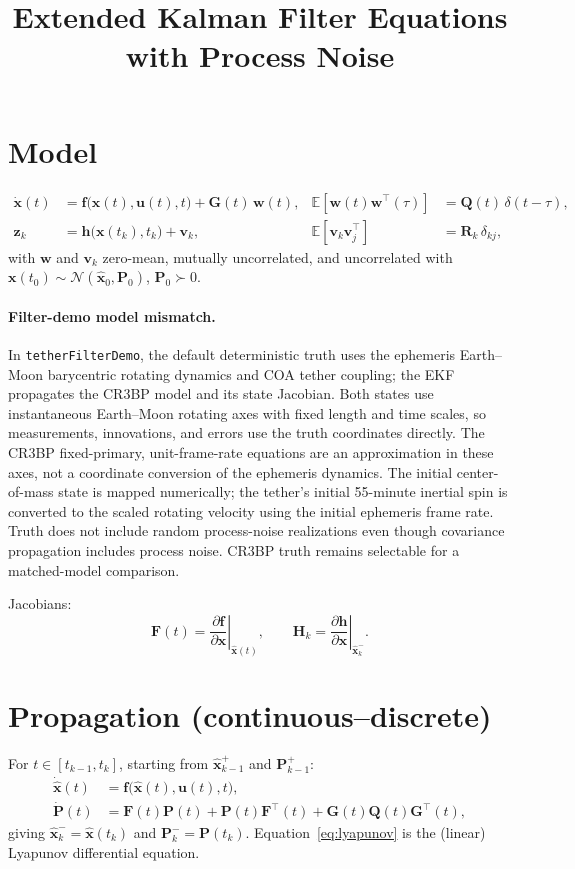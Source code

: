 \documentclass[]{article}
\title{Extended Kalman Filter Equations with Process Noise}
\author{}
\date{}
\newcommand{\x}{\bm{x}}
\newcommand{\xh}{\hat{\bm{x}}}
\newcommand{\z}{\bm{z}}
\newcommand{\Pm}{\mathbf{P}}
\newcommand{\Fm}{\mathbf{F}}
\newcommand{\Gm}{\mathbf{G}}
\newcommand{\Hm}{\mathbf{H}}
\newcommand{\Qm}{\mathbf{Q}}
\newcommand{\Rm}{\mathbf{R}}
\begin{document}
\maketitle

\section*{Model}
\begin{align}
  \dot{\x}(t) &= \bm{f}\big(\x(t),\bm{u}(t),t\big) + \Gm(t)\,\bm{w}(t),
  & \mathbb{E}\!\left[\bm{w}(t)\bm{w}^\top(\tau)\right] &= \Qm(t)\,\delta(t-\tau), \\
  \z_k &= \bm{h}\big(\x(t_k),t_k\big) + \bm{v}_k,
  & \mathbb{E}\!\left[\bm{v}_k\bm{v}_j^\top\right] &= \Rm_k\,\delta_{kj},
\end{align}
with $\bm{w}$ and $\bm{v}_k$ zero-mean, mutually uncorrelated, and
uncorrelated with $\x(t_0)\sim\mathcal{N}(\xh_0,\Pm_0)$, $\Pm_0\succ 0$.

\paragraph{Filter-demo model mismatch.}
In \texttt{tetherFilterDemo}, the default deterministic truth uses the
ephemeris Earth--Moon barycentric rotating dynamics and COA tether coupling;
the EKF propagates the CR3BP model and its state Jacobian. Both states use
instantaneous Earth--Moon rotating axes with fixed length and time scales, so
measurements, innovations, and errors use the truth coordinates directly.
The CR3BP fixed-primary, unit-frame-rate equations are an approximation in
these axes, not a coordinate conversion of the ephemeris dynamics. The
initial center-of-mass state is mapped numerically; the tether's initial
55-minute inertial spin is converted to the scaled rotating velocity using
the initial ephemeris frame rate. Truth does not include random process-noise
realizations even though covariance propagation includes process noise.
CR3BP truth remains selectable for a matched-model comparison.

Jacobians:
\begin{equation}
  \Fm(t) = \left.\frac{\partial \bm{f}}{\partial \x}\right|_{\xh(t)}, \qquad
  \Hm_k  = \left.\frac{\partial \bm{h}}{\partial \x}\right|_{\xh_k^-}.
\end{equation}

\section*{Propagation (continuous--discrete)}
For $t\in[t_{k-1},t_k]$, starting from $\xh_{k-1}^+$ and $\Pm_{k-1}^+$:
\begin{align}
  \dot{\xh}(t) &= \bm{f}\big(\xh(t),\bm{u}(t),t\big), \\
  \dot{\Pm}(t) &= \Fm(t)\Pm(t) + \Pm(t)\Fm^\top(t) + \Gm(t)\Qm(t)\Gm^\top(t),
  \label{eq:lyapunov}
\end{align}
giving $\xh_k^- = \xh(t_k)$ and $\Pm_k^- = \Pm(t_k)$.
Equation~\eqref{eq:lyapunov} is the (linear) Lyapunov differential equation.
\end{document}
